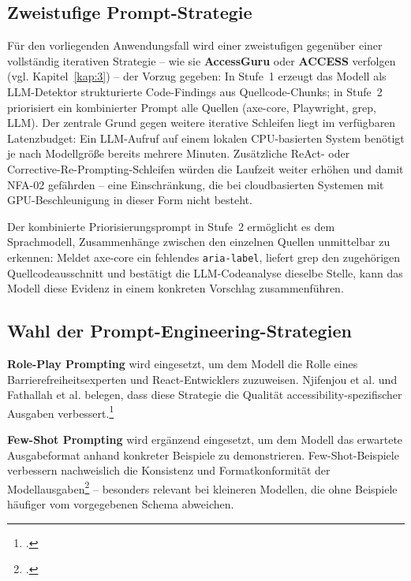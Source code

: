 \subsection{Zweistufige Prompt-Strategie}

Für den vorliegenden Anwendungsfall wird einer zweistufigen gegenüber einer vollständig iterativen Strategie -- wie sie \textbf{AccessGuru} oder \textbf{ACCESS} verfolgen (vgl. Kapitel~\ref{kap:3}) -- der Vorzug gegeben: In Stufe~1 erzeugt das Modell als \ac{LLM}-Detektor strukturierte Code-Findings aus Quellcode-Chunks; in Stufe~2 priorisiert ein kombinierter Prompt alle Quellen (axe-core, Playwright, grep, \ac{LLM}). Der zentrale Grund gegen weitere iterative Schleifen liegt im verfügbaren Latenzbudget: Ein \ac{LLM}-Aufruf auf einem lokalen \ac{CPU}-basierten System benötigt je nach Modellgröße bereits mehrere Minuten. Zusätzliche ReAct- oder Corrective-Re-Prompting-Schleifen würden die Laufzeit weiter erhöhen und damit \ac{NFA}-02 gefährden -- eine Einschränkung, die bei cloudbasierten Systemen mit \ac{GPU}-Beschleunigung in dieser Form nicht besteht.

Der kombinierte Priorisierungsprompt in Stufe~2 ermöglicht es dem Sprachmodell, Zusammenhänge zwischen den einzelnen Quellen unmittelbar zu erkennen: Meldet axe-core ein fehlendes \texttt{aria-label}, liefert grep den zugehörigen Quellcodeausschnitt und bestätigt die \ac{LLM}-Codeanalyse dieselbe Stelle, kann das Modell diese Evidenz in einem konkreten Vorschlag zusammenführen.

\subsection{Wahl der Prompt-Engineering-Strategien}

\textbf{Role-Play Prompting} wird eingesetzt, um dem Modell die Rolle eines Barrierefreiheitsexperten und React-Entwicklers zuzuweisen. Njifenjou et al. und Fathallah et al. belegen, dass diese Strategie die Qualität accessibility-spezifischer Ausgaben verbessert.\footcites[Vgl.][]{njifenjou_role-play_2024}[][]{fathallah_accessguru_2025}

\textbf{Few-Shot Prompting} wird ergänzend eingesetzt, um dem Modell das erwartete Ausgabeformat anhand konkreter Beispiele zu demonstrieren. Few-Shot-Beispiele verbessern nachweislich die Konsistenz und Formatkonformität der Modellausgaben\footcite[Vgl.][S.~5]{brown2020gpt3fewshot} -- besonders relevant bei kleineren Modellen, die ohne Beispiele häufiger vom vorgegebenen Schema abweichen.

